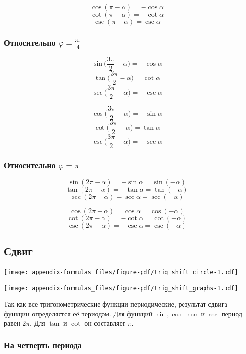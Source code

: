 \documentclass[
  letterpaper,
]{scrbook}
\theoremstyle{definition}
\theoremstyle{remark}
\begin{document}
\[\cos (\pi-\alpha) = -\cos \alpha\]
\[\cot (\pi-\alpha) = -\cot \alpha\] \[\csc (\pi-\alpha) = \csc \alpha\]

\subsubsection{\texorpdfstring{Относительно
\(\varphi = \frac{3\pi}{4}\)}{Относительно \textbackslash varphi = \textbackslash frac\{3\textbackslash pi\}\{4\}}}\label{trig_reflections_3pi2}

\[\sin \Big(\frac{3\pi}{2}-\alpha\Big) = -\cos \alpha\]
\[\tan \Big(\frac{3\pi}{2}-\alpha\Big) = \cot \alpha\]
\[\sec \Big(\frac{3\pi}{2}-\alpha\Big) = -\csc \alpha\]

\[\cos \Big(\frac{3\pi}{2}-\alpha\Big) = -\sin \alpha\]
\[\cot \Big(\frac{3\pi}{2}-\alpha\Big) = \tan \alpha\]
\[\csc \Big(\frac{3\pi}{2}-\alpha\Big) = -\sec \alpha\]

\subsubsection{\texorpdfstring{Относительно
\(\varphi = \pi\)}{Относительно \textbackslash varphi = \textbackslash pi}}\label{trig_reflections_pi}

\[\sin (2\pi - \alpha) = -\sin \alpha = \sin (-\alpha)\]
\[\tan (2\pi - \alpha) = -\tan \alpha = \tan (-\alpha)\]
\[\sec (2\pi - \alpha) = \sec \alpha = \sec (-\alpha)\]

\[\cos (2\pi - \alpha) = \cos \alpha = \cos (-\alpha)\]
\[\cot (2\pi - \alpha) = -\cot \alpha = \cot (-\alpha)\]
\[\csc (2\pi - \alpha) = -\csc \alpha = \csc (-\alpha)\]

\subsection{Сдвиг}\label{trig_shift}

\texttt{[image: appendix-formulas\_files/figure-pdf/trig\_shift\_circle-1.pdf]}

\texttt{[image: appendix-formulas\_files/figure-pdf/trig\_shift\_graphs-1.pdf]}

Так как все тригонометрические функции периодические, результат сдвига
функции определяется её периодом. Для функций \(\sin, \cos, \sec\) и
\(\csc\) период равен \(2\pi\). Для \(\tan\) и \(\cot\) он составляет
\(\pi\).

\subsubsection{На четверть периода}\label{trig_shift_by_one_quarter}
\end{document}
